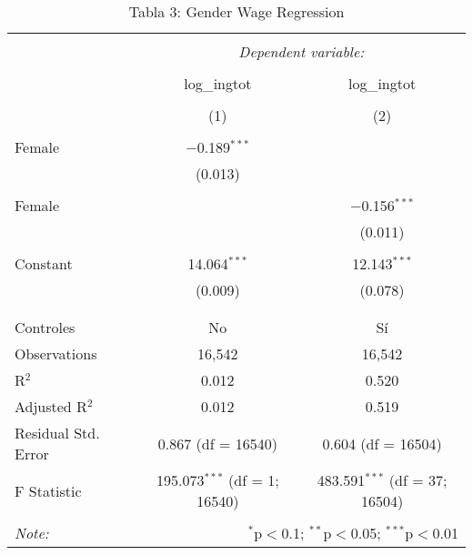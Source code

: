 
\begin{table}[!htbp] \centering 
  \caption{Tabla 3: Gender Wage Regression} 
  \label{} 
\begin{tabular}{@{\extracolsep{5pt}}lcc} 
\\[-1.8ex]\hline 
\hline \\[-1.8ex] 
 & \multicolumn{2}{c}{\textit{Dependent variable:}} \\ 
\cline{2-3} 
\\[-1.8ex] & log\_ingtot & log\_ingtot \\ 
\\[-1.8ex] & (1) & (2)\\ 
\hline \\[-1.8ex] 
 Female & $-$0.189$^{***}$ &  \\ 
  & (0.013) &  \\ 
  & & \\ 
 Female &  & $-$0.156$^{***}$ \\ 
  &  & (0.011) \\ 
  & & \\ 
 Constant & 14.064$^{***}$ & 12.143$^{***}$ \\ 
  & (0.009) & (0.078) \\ 
  & & \\ 
\hline \\[-1.8ex] 
Controles & No & Sí \\ 
Observations & 16,542 & 16,542 \\ 
R$^{2}$ & 0.012 & 0.520 \\ 
Adjusted R$^{2}$ & 0.012 & 0.519 \\ 
Residual Std. Error & 0.867 (df = 16540) & 0.604 (df = 16504) \\ 
F Statistic & 195.073$^{***}$ (df = 1; 16540) & 483.591$^{***}$ (df = 37; 16504) \\ 
\hline 
\hline \\[-1.8ex] 
\textit{Note:}  & \multicolumn{2}{r}{$^{*}$p$<$0.1; $^{**}$p$<$0.05; $^{***}$p$<$0.01} \\ 
\end{tabular} 
\end{table} 
